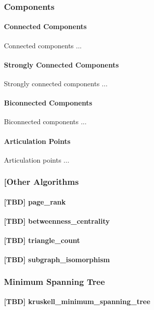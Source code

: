 \documentclass[10pt,onecolumn]{article}
\begin{document}
\subsubsection{Components}
\paragraph{Connected Components}
Connected components \cite{REF_} ...

\paragraph{Strongly Connected Components}
Strongly connected components \cite{REF_} ...

\paragraph{Biconnected Components}
Biconnected components \cite{REF_} ...

\paragraph{Articulation Points}
Articulation points \cite{REF_} ...

\subsubsection{[Other Algorithms}
\paragraph{[TBD] page\_rank}
\paragraph{[TBD] betweenness\_centrality}
\paragraph{[TBD] triangle\_count}
\paragraph{[TBD] subgraph\_isomorphism}
\subsubsection{Minimum Spanning Tree}
\paragraph{[TBD] kruskell\_minimum\_spanning\_tree}
\end{document}
